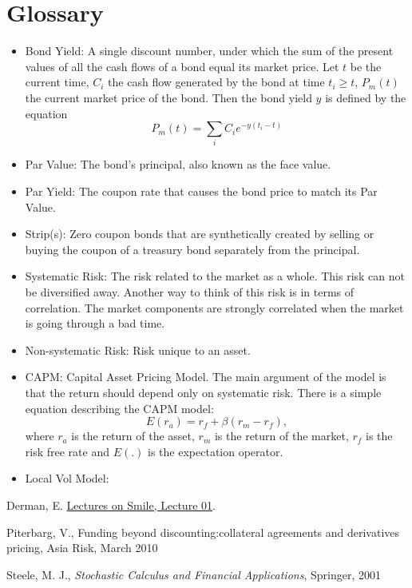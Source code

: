\documentclass{amsart}
\theoremstyle{plain}
\numberwithin{equation}{section}
\begin{document}
\section{Glossary}
\begin{itemize}
	\item Bond Yield: A single discount number, under which
	the sum of the present values of all the cash flows of a bond equal 
	its market price. Let $t$ be the current time, $C_i$ the cash flow generated by the bond at
	time $t_i \geq t$, $P_m(t)$ the current market price of the bond. Then the bond yield
	$y$ is defined by the equation
	\begin{equation}
	P_m(t) = \sum_{i} C_i e^{- y (t_i - t )}
	\label{eq:bond_yield}
	\end{equation}
	\item Par Value: The bond's principal, also known as the face value. 
	\item Par Yield: The coupon rate that causes the bond price to match 
	its Par Value.
	\item Strip(s): Zero coupon bonds that are synthetically created by 
	selling or buying the coupon of a treasury bond separately from the principal.
	\item Systematic Risk: The risk related to the market as a whole. This 
	risk can not be diversified away. Another way to think of this risk 
	is in terms of correlation. The market components are strongly correlated
	when the market is going through a bad time.
	\item Non-systematic Risk: Risk unique to an asset.
	\item CAPM: Capital Asset Pricing Model. The main argument of the model is that 
	the return should depend only on systematic risk. There is a simple 
	equation describing the CAPM model:
	\begin{equation}
	E(r_a) = r_f + \beta( r_m - r_f ),
	\label{eq:capm}
	\end{equation}
	where $r_a$ is the return of the asset,
	$r_m$ is the return of the market, 
	$r_f$ is the risk free rate and $E(.)$ is 
	the expectation operator. 
	
	\item Local Vol Model: 
	
	
\end{itemize}

\begin{thebibliography}{9}                                                                                                %
Derman, E. \href{http://www.emanuelderman.com/media/smile-lecture1.pdf}
{Lectures on Smile, Lecture 01}.

Piterbarg, V., Funding beyond discounting:collateral agreements and
derivatives pricing, Asia Risk, March 2010

Steele, M. J., \textit{Stochastic Calculus and Financial Applications}, 
Springer, 2001

\end{thebibliography}
\end{document}
